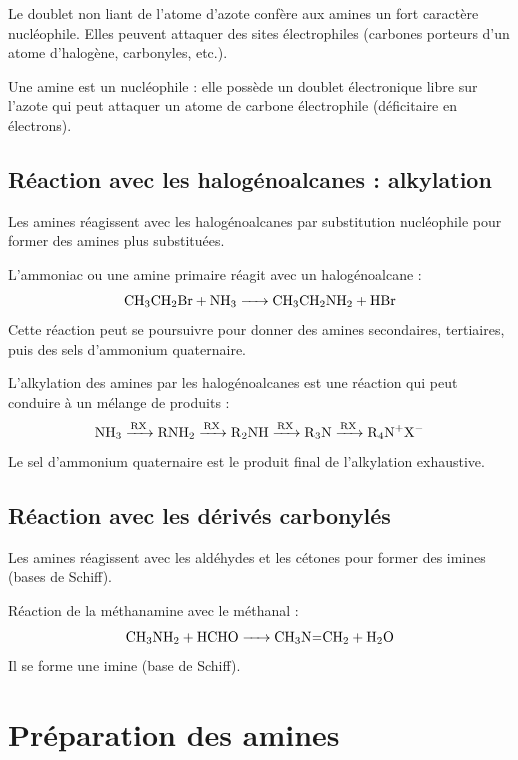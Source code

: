 Le doublet non liant de l'atome d'azote confère aux amines un fort caractère nucléophile. Elles peuvent attaquer des sites électrophiles (carbones porteurs d'un atome d'halogène, carbonyles, etc.).

\begin{definition}
Une amine est un nucléophile : elle possède un doublet électronique libre sur l'azote qui peut attaquer un atome de carbone électrophile (déficitaire en électrons).
\end{definition}

\subsection{Réaction avec les halogénoalcanes : alkylation}

Les amines réagissent avec les halogénoalcanes par substitution nucléophile pour former des amines plus substituées.

\begin{experience}
L'ammoniac ou une amine primaire réagit avec un halogénoalcane :
\[\ce{CH3CH2Br + NH3 -> CH3CH2NH2 + HBr}\]
Cette réaction peut se poursuivre pour donner des amines secondaires, tertiaires, puis des sels d'ammonium quaternaire.
\end{experience}

\begin{propriete}
L'alkylation des amines par les halogénoalcanes est une réaction qui peut conduire à un mélange de produits :
\[\ce{NH3 ->[RX] RNH2 ->[RX] R2NH ->[RX] R3N ->[RX] R4N+X-}\]
Le sel d'ammonium quaternaire  est le produit final de l'alkylation exhaustive.
\end{propriete}

\subsection{Réaction avec les dérivés carbonylés}

Les amines réagissent avec les aldéhydes et les cétones pour former des imines (bases de Schiff).

\begin{exemple}
Réaction de la méthanamine avec le méthanal :
\[\ce{CH3NH2 + HCHO -> CH3N=CH2 + H2O}\]
Il se forme une imine (base de Schiff).
\end{exemple}

\section{Préparation des amines}


